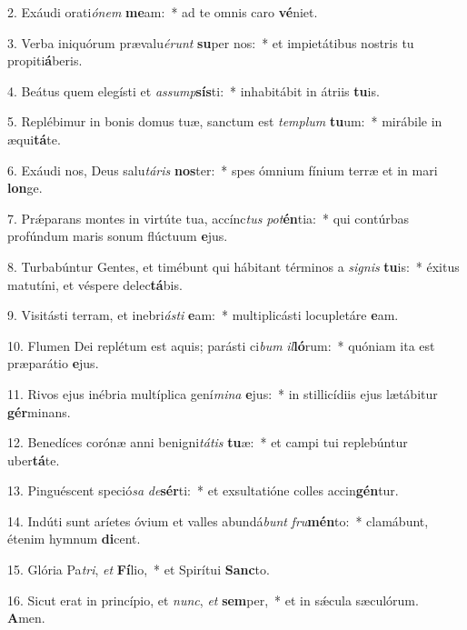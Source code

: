 2. Exáudi orati\textit{ó}\textit{nem} \textbf{me}am:~*  ad te omnis caro \textbf{vé}niet.\

3. Verba iniquórum prævalu\textit{é}\textit{runt} \textbf{su}per nos:~*  et impietátibus nostris tu propiti\textbf{á}beris.\

4. Beátus quem elegísti et \textit{as}\textit{sump}\textbf{sís}ti:~*  inhabitábit in átriis \textbf{tu}is.\

5. Replébimur in bonis domus tuæ, sanctum est \textit{tem}\textit{plum} \textbf{tu}um:~*  mirábile in æqui\textbf{tá}te.\

6. Exáudi nos, Deus salu\textit{tá}\textit{ris} \textbf{nos}ter:~*  spes ómnium fínium terræ et in mari \textbf{lon}ge.\

7. Prǽparans montes in virtúte tua, accínc\textit{tus} \textit{pot}\textbf{én}tia:~*  qui contúrbas profúndum maris sonum flúctuum \textbf{e}jus.\

8. Turbabúntur Gentes, et timébunt qui hábitant términos a \textit{si}\textit{gnis} \textbf{tu}is:~*  éxitus matutíni, et véspere delec\textbf{tá}bis.\

9. Visitásti terram, et inebri\textit{ás}\textit{ti} \textbf{e}am:~*  multiplicásti locupletáre \textbf{e}am.\

10. Flumen Dei replétum est aquis; parásti ci\textit{bum} \textit{il}\textbf{ló}rum:~*  quóniam ita est præparátio \textbf{e}jus.\

11. Rivos ejus inébria multíplica gení\textit{mi}\textit{na} \textbf{e}jus:~*  in stillicídiis ejus lætábitur \textbf{gér}minans.\

12. Benedíces corónæ anni benigni\textit{tá}\textit{tis} \textbf{tu}æ:~*  et campi tui replebúntur uber\textbf{tá}te.\

13. Pinguéscent speció\textit{sa} \textit{de}\textbf{sér}ti:~*  et exsultatióne colles accin\textbf{gén}tur.\

14. Indúti sunt aríetes óvium et valles abundá\textit{bunt} \textit{fru}\textbf{mén}to:~*  clamábunt, étenim hymnum \textbf{di}cent.\

15. Glória Pa\textit{tri}, \textit{et} \textbf{Fí}lio,~*  et Spirítui \textbf{Sanc}to.\

16. Sicut erat in princípio, et \textit{nunc}, \textit{et} \textbf{sem}per,~*  et in sǽcula sæculórum. \textbf{A}men.\

